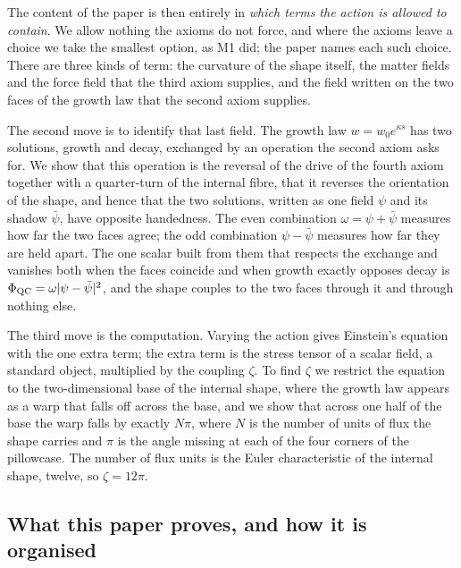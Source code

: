 \documentclass[11pt,a4paper]{article}
\theoremstyle{plain}
\theoremstyle{definition}
\theoremstyle{remark}
\begin{document}
The content of the paper is then entirely in \emph{which terms the action
is allowed to contain}. We allow nothing the axioms do not force, and where
the axioms leave a choice we take the smallest option, as M1 did; the paper
names each such choice. There are three kinds of term: the curvature of the
shape itself, the matter fields and the force field that the third axiom
supplies, and the field written on the two faces of the growth law that the
second axiom supplies.

The second move is to identify that last field. The growth law $w=w_{0}e^{\kappa s}$ has two solutions, growth and decay, exchanged by an operation the second axiom asks for. We show that this operation is the reversal of the drive of the fourth axiom together with a quarter-turn of the internal fibre, that it reverses the orientation of the shape, and hence that the two solutions, written as one field $\psi$ and its shadow $\bar\psi$, have opposite handedness. The even combination $\omega=\psi+\bar\psi$ measures how far the two faces agree; the odd combination $\psi-\bar\psi$ measures how far they are held apart. The one scalar built from them that respects the exchange and vanishes both when the faces coincide and when growth exactly opposes decay is $\Phi_{\mathrm{QC}}=\omega\lvert\psi-\bar\psi\rvert^{2}$, and the shape couples to the two faces through it and through nothing else.

The third move is the computation. Varying the action gives Einstein's equation with the one extra term; the extra term is the stress tensor of a scalar field, a standard object, multiplied by the coupling $\zeta$. To find $\zeta$ we restrict the equation to the two-dimensional base of the internal shape, where the growth law appears as a warp that falls off across the base, and we show that across one half of the base the warp falls by exactly $N\pi$, where $N$ is the number of units of flux the shape carries and $\pi$ is the angle missing at each of the four corners of the pillowcase. The number of flux units is the Euler characteristic of the internal shape, twelve, so $\zeta=12\pi$.

\subsection{What this paper proves, and how it is organised}\label{sec:results}
\end{document}
